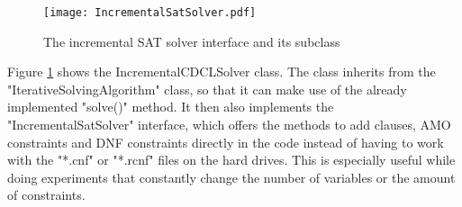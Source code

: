 \begin{figure}[htbp]
  \centering
  \texttt{[image: IncrementalSatSolver.pdf]}
  \caption{The incremental SAT solver interface and its subclass}
  \label{fig:incrementalSAT}
\end{figure}

Figure \ref{fig:incrementalSAT} shows the IncrementalCDCLSolver class. The class inherits from the "IterativeSolvingAlgorithm" class, so that it can make use of the already implemented "solve()" method. It then also implements the "IncrementalSatSolver" interface, which offers the methods to add clauses, AMO constraints and DNF constraints directly in the code instead of having to work with the "*.cnf" or "*.rcnf" files on the hard drives. This is especially useful while doing experiments that constantly change the number of variables or the amount of constraints.
